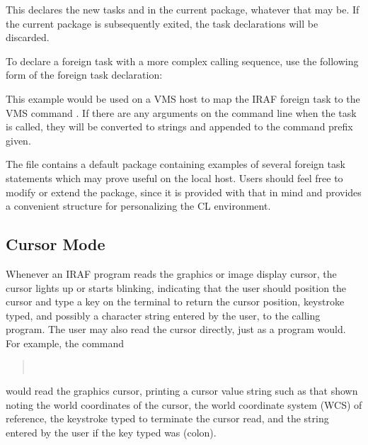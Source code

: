 \noindent
This declares the new tasks  and  in the current
package, whatever that may be.  If the current package is subsequently exited,
the task declarations will be discarded.

To declare a foreign task with a more complex calling sequence, use the
following form of the foreign task declaration:

\begin{quotation}\noindent
{} 
\end{quotation}

\noindent
This example would be used on a VMS host to map the IRAF foreign task
 to the VMS command .  If there are
any arguments on the command line when the task is called, they will be
converted to strings and appended to the command prefix given.

The  file contains a default  package
containing examples of several foreign task statements which may prove
useful on the local host.  Users should feel free to modify or extend
the  package, since it is provided with that in mind and
provides a convenient structure for personalizing the CL environment.

\subsection{Cursor Mode}

\ppind
Whenever an IRAF program reads the graphics or image display cursor,
the cursor lights up or starts blinking, indicating that the user should
position the cursor and type a key on the terminal to return the cursor
position, keystroke typed, and possibly a character string entered by
the user, to the calling program.  The user may also read the cursor
directly, just as a program would.  For example, the command

\begin{quotation}\noindent
{} \\
\smallskip
{}
\end{quotation}

\noindent
would read the graphics cursor, printing a cursor value string such as that
shown noting the world coordinates of the cursor, the world coordinate system
(WCS) of reference, the keystroke typed to terminate the cursor read, and
the string entered by the user if the key typed was \usertype{:} (colon).

